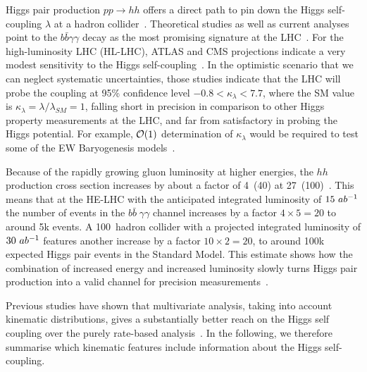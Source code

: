 \label{sec:THanetal}

Higgs pair production $pp\rightarrow hh$ offers a direct path to pin
down the Higgs self-coupling $\lambda$ at a hadron collider~\cite{Eboli:1987dy, Dicus:1987ic, Glover:183945, Plehn:1996wb, Djouadi:1999rca, Li:2013rra}.  
Theoretical studies as well as current analyses
point to the $b\bar{b}\gamma\gamma$ decay as the most promising
signature at the LHC~\cite{ATLAS-CONF-2016-004, Aad:2015xja}. 
For the high-luminosity LHC (HL-LHC),
ATLAS and CMS projections indicate a very modest sensitivity to the
Higgs self-coupling~\cite{ATL-PHYS-PUB-2017-001, CMS-PAS-FTR-16-002}. 
In the optimistic scenario that we can neglect systematic
uncertainties, those studies indicate that the LHC will probe the
coupling at 95\% confidence level $-0.8 < \kappa_\lambda < 7.7$, where the SM value is $\kappa_\lambda = \lambda/\lambda_{SM}=1$, 
falling short in precision in comparison to other Higgs 
property measurements at the LHC, and far from satisfactory in probing the
Higgs potential. For example, ${\cal O}(1)$ determination of $\kappa_\lambda$ would be required to 
test some of the EW Baryogenesis models~\cite{Kobakhidze:2015xlz, Chen:2017qcz, Gan:2017mcv, Cao:2017oez, Jain:2017sqm, deVries:2017ncy, Reichert:2017puo, Carena:2018vpt}.

Because of the rapidly growing gluon luminosity at higher energies,
the $hh$ production cross section increases by about a factor of
4~(40) at 27~(100)~\UTeV.  This means that at the HE-LHC with the
anticipated integrated luminosity of $15~ab^{-1}$ the number of events in
the $b\bar{b} \; \gamma \gamma$ channel increases by a factor $4
\times 5 = 20$ to around 5k events.  A 100~\UTeV hadron collider with
a projected integrated luminosity of $30~ab^{-1}$ features another
increase by a factor $10 \times 2=20$, to around 100k expected Higgs
pair events in the Standard Model.
This estimate shows how the combination of increased energy and
increased luminosity slowly turns Higgs pair production into a valid
channel for precision measurements~\cite{Goncalves:2018yva}. 


Previous studies have shown that multivariate analysis, taking into 
account kinematic distributions, gives a substantially better reach 
on the Higgs self coupling over the purely rate-based 
analysis~\cite{Goncalves:2018yva,Kling:2016lay,Barger:2014qva,Bauer:2017cov}. In the following, we therefore 
summarise which kinematic features include information about the 
Higgs self-coupling. 

